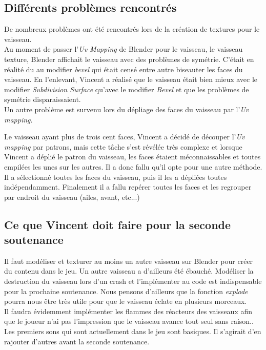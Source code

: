 \documentclass[10pt, titlepage]{report}
\begin{document}
\subsection{Différents problèmes rencontrés}

De nombreux problèmes ont été rencontrés lors de la création de textures pour le vaisseau.\\

Au moment de passer l’\textit{Uv Mapping} de Blender pour le vaisseau, le vaisseau texture, Blender affichait le vaisseau avec des problèmes de symétrie. C’était en réalité du au modifier \textit{bevel} qui était censé entre autre biseauter les faces du vaisseau. En l’enlevant, Vincent a réalisé que le vaisseau était bien mieux avec le modifier  \textit{Subdivision Surface} qu’avec le modifier \textit{Bevel} et que les problèmes de symétrie disparaissaient.\\

Un autre problème est survenu lors du dépliage des faces du vaisseau par l’\textit{Uv mapping}.

Le vaisseau ayant plus de trois cent faces, Vincent a décidé de découper l’\textit{Uv mapping} par patrons, mais cette tâche s’est révélée très complexe et lorsque Vincent a déplié le patron du vaisseau, les faces étaient méconnaissables et toutes empilées les unes sur les autres. Il a donc fallu qu’il opte pour une autre méthode. Il a sélectionné toutes les faces du vaisseau, puis il les a dépliées toutes indépendamment. Finalement il a fallu repérer toutes les faces et les regrouper par endroit du vaisseau (ailes, avant, etc...)

\subsection{Ce que Vincent doit faire pour la seconde soutenance}
Il faut modéliser et texturer au moins un autre vaisseau sur Blender pour créer du contenu dans le jeu. Un autre vaisseau a d’ailleurs été ébauché.
Modéliser la destruction du vaisseau lors d'un crash et l'implémenter au code est indispensable pour la prochaine soutenance. Nous pensons d’ailleurs que la fonction \textit{explode} pourra nous être très utile pour que le vaisseau éclate en plusieurs morceaux.\\

Il faudra évidemment implémenter les flammes des réacteurs des vaisseaux afin que le joueur n’ai pas l’impression que le vaisseau avance tout seul sans raison..
Les premiers sons qui sont actuellement dans le jeu sont basiques. Il s’agirait d’en rajouter d’autres avant la seconde soutenance.\\
\end{document}
